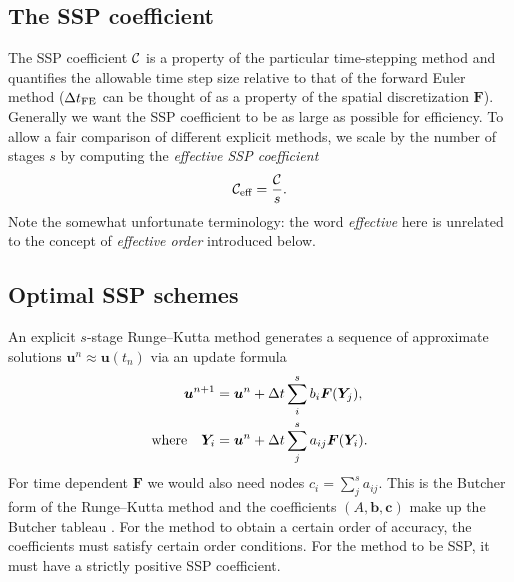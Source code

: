 \subsection{The SSP coefficient}

The SSP coefficient $\mathcal{C}$ is a property of the particular time-stepping method and quantifies the allowable time step size relative to that of the forward Euler method
($\Delta t_{\text{FE}}$ can be thought of as a property of the spatial discretization $\bm{F}$).
Generally we want the SSP coefficient to be as large as possible for efficiency.
To allow a fair comparison of different explicit methods, we scale by the number of stages $s$ by computing the \emph{effective SSP coefficient}
$$\mathcal{C}_{\text{eff}} = \frac{\mathcal{C}}{s}.$$
Note the somewhat unfortunate terminology: the word \emph{effective} here is unrelated to the concept of \emph{effective order} introduced below.


\subsection{Optimal SSP schemes}
\label{subsec:Optimal_SSPRK}


An explicit $s$-stage Runge--Kutta method generates a sequence of approximate solutions $\bm{u}^n \approx \bm{u}(t_n)$ via an update formula
\begin{align*}
\bm{u}^{n+1} &= \bm{u}^{n} + \Delta t \sum_i^s b_i \bm{F}(\bm{Y}_j), \\
\text{where} \quad \bm{Y}_{i} &= \bm{u}^{n} + \Delta t \sum_j^s a_{ij} \bm{F}(\bm{Y}_i).
\end{align*}
For time dependent $\bm{F}$ we would also need nodes $c_i =
\sum_j^sa_{ij}$.
This is the Butcher form of the Runge--Kutta method and the
coefficients $(A,\bm{b},\bm{c})$ make up the Butcher tableau
\cite{Butcher2008_book}.
For the method to obtain a certain order of accuracy, the coefficients must satisfy certain order conditions.
For the method to be SSP, it must have a strictly positive SSP
coefficient.

